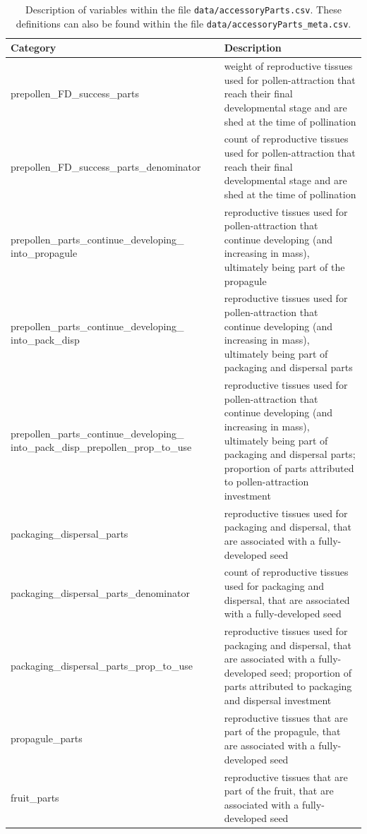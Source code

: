 \documentclass[10pt,twoside]{article}\usepackage[]{graphicx}\usepackage[]{color}
\begin{document}
\begingroup\small
\begin{longtable}{p{6cm}p{10cm}}
\caption{Description of variables within the file \texttt{data/accessoryParts.csv}. These definitions can also be found within the file \texttt{data/accessoryParts\_meta.csv}.} \\ 
  \hline
Category & Description \\ 
  \hline
prepollen\_FD\_success\_parts & weight of reproductive tissues used for pollen-attraction that reach their final developmental stage and are shed at the time of pollination \\ 
  prepollen\_FD\_success\_parts\_denominator & count of reproductive tissues used for pollen-attraction that reach their final developmental stage and are shed at the time of pollination \\ 
  prepollen\_parts\_continue\_developing\_ into\_propagule & reproductive tissues used for pollen-attraction that continue developing (and increasing in mass), ultimately being part of the propagule  \\ 
  prepollen\_parts\_continue\_developing\_ into\_pack\_disp & reproductive tissues used for pollen-attraction that continue developing (and increasing in mass), ultimately being part of packaging and dispersal parts \\ 
  prepollen\_parts\_continue\_developing\_ into\_pack\_disp\_prepollen\_prop\_to\_use & reproductive tissues used for pollen-attraction that continue developing (and increasing in mass), ultimately being part of packaging and dispersal parts; proportion of parts attributed to pollen-attraction investment \\ 
  packaging\_dispersal\_parts & reproductive tissues used for packaging and dispersal, that are associated with a fully-developed seed \\ 
  packaging\_dispersal\_parts\_denominator & count of reproductive tissues used for packaging and dispersal, that are associated with a fully-developed seed \\ 
  packaging\_dispersal\_parts\_prop\_to\_use & reproductive tissues used for packaging and dispersal, that are associated with a fully-developed seed; proportion of parts attributed to packaging and dispersal investment \\ 
  propagule\_parts & reproductive tissues that are part of the propagule, that are associated with a fully-developed seed \\ 
  fruit\_parts & reproductive tissues that are part of the fruit, that are associated with a fully-developed seed \\ 

\end{longtable}
\end{document}
